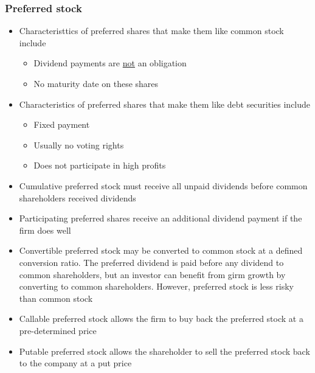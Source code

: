 \documentclass[../notes_compiled.tex]{subfiles}
\begin{document}
\subsubsection{Preferred stock}
\begin{itemize}
\item Characteristtics of preferred shares that make them like common stock include
\begin{itemize}
\item Dividend payments are \underline{not} an obligation
\item No maturity date on these shares
\end{itemize}

\item Characteristics of preferred shares that make them like debt securities include
\begin{itemize}
\item Fixed payment
\item Usually no voting rights
\item Does not participate in high profits

\end{itemize}

\item Cumulative preferred stock must receive all unpaid dividends before common shareholders received dividends
\item Participating preferred shares receive an additional dividend payment if the firm does well
\item Convertible preferred stock may be converted to common stock at a defined conversion ratio. The preferred dividend is paid before any dividend to common shareholders, but an investor can benefit from girm growth by converting to common shareholders. However, preferred stock is less risky than common stock
\item Callable preferred stock allows the firm to buy back the preferred stock at a pre-determined price
\item Putable preferred stock allows the shareholder to sell the preferred stock back to the company at a put price

\end{itemize}
\end{document}
